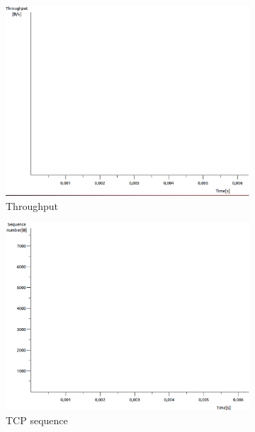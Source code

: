 \documentclass[conference,a4paper]{../../sty/IEEEtran}
\begin{document}
\begin{figure}
 \centering
 \begin{subfigure}[b]{0.2\textwidth}
  \includegraphics[width=\textwidth]{s2-3_thru}
  \caption{Throughput}
 \end{subfigure}
 \begin{subfigure}[b]{0.2\textwidth}
  \includegraphics[width=\textwidth]{s2-3_seq}
  \caption{TCP sequence}
 \end{subfigure}
 \begin{subfigure}[b]{0.2\textwidth}

\end{subfigure}
\end{figure}
\end{document}
